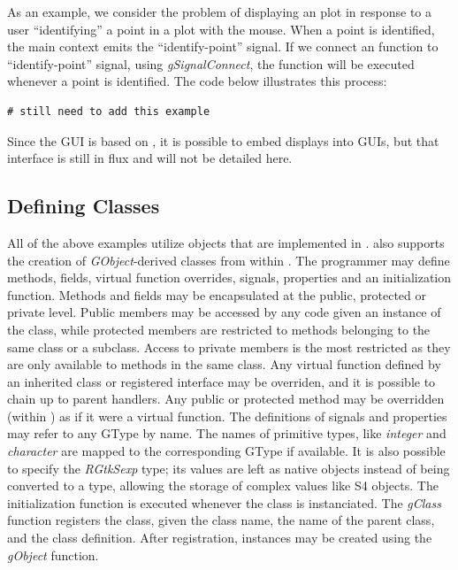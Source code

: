 \documentclass[article]{jss}
\begin{document}
As an example, we consider the problem of displaying an  plot in
response to a user ``identifying'' a point in a  plot with the mouse.
When a  point is identified, the main  context emits
the ``identify-point'' signal. If we connect an  function to
``identify-point'' signal, using \emph{gSignalConnect}, the function will be
executed whenever a point is identified. The code below illustrates this process:
\begin{verbatim}
# still need to add this example
\end{verbatim}
Since the  GUI is based on , it is possible to embed 
 displays into  GUIs, but that interface is still in flux
and will not be detailed here.

\subsection[Defining GObject Classes]{Defining  Classes}

All of the above examples utilize objects that are implemented in .
 also supports the creation of \emph{GObject}-derived classes from within
. The programmer may define methods, fields, virtual function
overrides, signals, properties and an initialization function. 
Methods and fields may be encapsulated at the public, protected or private level.
Public members may be accessed by any code given an instance of the class, 
while protected members are restricted to methods belonging to the same class or
a subclass. Access to private members is the most restricted as they are only 
available to methods in the same class. Any 
virtual function defined by an inherited class or registered interface may be 
overriden, and it is possible to chain up to parent handlers. Any public or 
protected method may be overridden (within ) as if it were a virtual
function. The definitions of signals and properties may refer to any GType by name. 
The names of primitive  types, like \emph{integer} and \emph{character} 
are mapped to the corresponding GType if available. It is also possible to specify the 
\emph{RGtkSexp} type; its values are left as native  objects instead
of being converted to a  type, allowing the storage of complex 
 values like S4 objects. The initialization function is executed 
whenever the class is instanciated. The \emph{gClass} function registers the 
class, given the class name, the name of the parent class, and the class 
definition. After registration, instances may be
created using the \emph{gObject} function.
\end{document}
